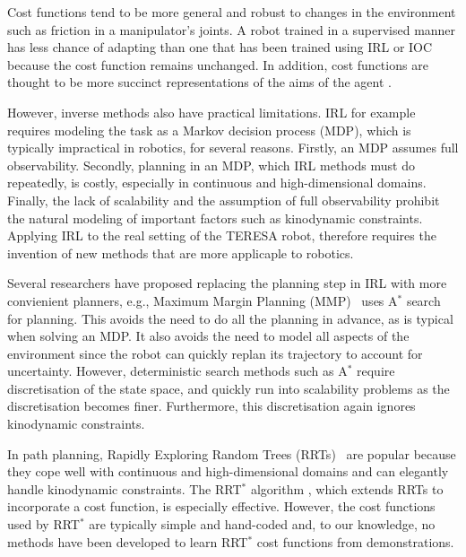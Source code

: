 \documentclass[a4paper,11pt]{report}
\begin{document}
Cost functions tend to be more general and robust to changes in the environment such as friction in a manipulator's joints. A robot trained in a supervised manner has less chance of adapting than one that has been trained using IRL or IOC because the cost function remains unchanged. In addition, cost functions are thought to be more succinct representations of the aims of the agent \cite{abbeel2004apprenticeship}. %

However, inverse methods also have practical limitations. IRL for example requires modeling the task as a Markov decision process (MDP), which is typically impractical in robotics, for several reasons.  Firstly, an MDP assumes full observability. Secondly, planning in an MDP, which IRL methods must do repeatedly, is costly, especially in continuous and high-dimensional domains. Finally, the lack of scalability and the assumption of full observability prohibit the natural modeling of important factors such as kinodynamic constraints. Applying IRL to the real setting of the TERESA robot, therefore requires the invention of new methods that are more applicaple to robotics. 

Several researchers have proposed replacing the planning step in IRL with more convienient planners, e.g., Maximum Margin Planning (MMP)~\cite{ratliff2006maximum} uses A$^*$ search for planning. This avoids the need to do all the planning in advance, as is typical when solving an MDP. It also avoids the need to model all aspects of the environment since the robot can quickly replan its trajectory to account for uncertainty. However, deterministic search methods such as A$^*$ require discretisation of the state space, and quickly run into scalability problems as the discretisation becomes finer. Furthermore, this discretisation again ignores kinodynamic constraints.

In path planning, Rapidly Exploring Random Trees (RRTs)~\cite{lavalle1998rapidly} are popular because they cope well with continuous and high-dimensional domains and can elegantly handle kinodynamic constraints. The RRT$^*$ algorithm \cite{karaman2011sampling}, which extends RRTs to incorporate a cost function, is especially effective. However, the cost functions used by RRT$^*$ are typically simple and hand-coded and, to our knowledge, no methods have been developed to learn RRT$^*$ cost functions from demonstrations.
\end{document}
